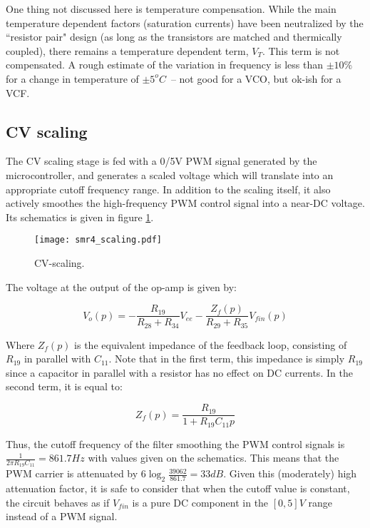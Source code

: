 \documentclass[a4paper,11pt]{article}
\begin{document}
One thing not discussed here is temperature compensation. While the main temperature dependent factors (saturation currents) have been neutralized by the ``resistor pair" design (as long as the transistors are matched and thermically coupled), there remains a temperature dependent term, $V_T$. This term is not compensated. A rough estimate of the variation in frequency is less than $\pm 10\%$ for a change in temperature of $\pm 5^oC$~-- not good for a VCO, but ok-ish for a VCF.

\subsection{CV scaling}

The CV scaling stage is fed with a 0/5V PWM signal generated by the microcontroller, and generates a scaled voltage which will translate into an appropriate cutoff frequency range. In addition to the scaling itself, it also actively smoothes the high-frequency PWM control signal into a near-DC voltage. Its schematics is given in figure \ref{fig:cvscale}.

\begin{figure}
\centering
\texttt{[image: smr4\_scaling.pdf]}
\caption{CV-scaling.}
\label{fig:cvscale}
\end{figure}

The voltage at the output of the op-amp is given by:

\begin{equation}
V_o(p) = -\frac{R_{19}}{R_{28} + R_{34}} V_{ee} -\frac{Z_f(p)}{R_{29} + R_{35}} V_{fin}(p)
\end{equation}

Where $Z_f(p)$ is the equivalent impedance of the feedback loop, consisting of $R_{19}$ in parallel with $C_{11}$. Note that in the first term, this impedance is simply $R_{19}$ since a capacitor in parallel with a resistor has no effect on DC currents. In the second term, it is equal to:

\begin{equation}
Z_f(p) = \frac{R_{19}}{1 + R_{19}C_{11}p}
\end{equation}

Thus, the cutoff frequency of the filter smoothing the PWM control signals is $\frac{1}{2 \pi R_{19}C_{11}} = 861.7 Hz$ with values given on the schematics. This means that the PWM carrier is attenuated by $6\log_2 \frac{39062}{861.7} = 33dB$. Given this (moderately) high attenuation factor, it is safe to consider that when the cutoff value is constant, the circuit behaves as if $V_{fin}$ is a pure DC component in the $[0, 5]V$ range instead of a PWM signal.
\end{document}
